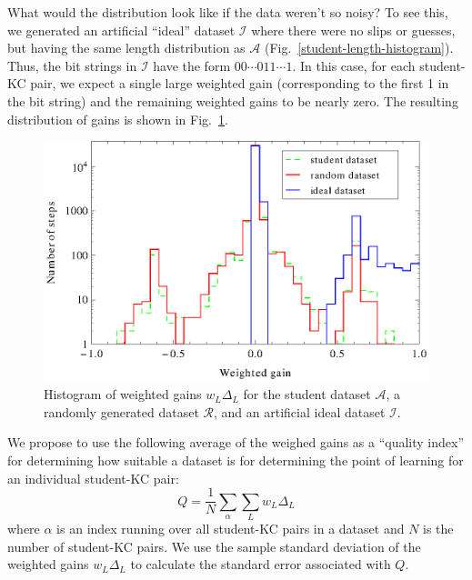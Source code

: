 \documentclass{acmlarge-edm}
\begin{document}
What would the distribution look like if the data weren't 
so noisy?  To see this, we generated an artificial ``ideal'' dataset
$\mathcal{I}$ where there were no slips or guesses, but having
the same length distribution as $\mathcal{A}$ 
(Fig.~\ref{student-length-histogram}).  Thus, the bit strings
in $\mathcal{I}$ have the form $00\cdots011\cdots1$.
In this case, for each student-KC pair, we expect a single 
large weighted gain (corresponding to the first 1 in the bit string) 
and the remaining weighted gains to be nearly zero.  The resulting 
distribution of gains is shown
in  Fig.~\ref{weighted-gain-histogram2}.

\begin{figure}
  \centering \includegraphics{weighted-gain-histogram2.eps}
   \caption{Histogram of weighted gains $w_L \Delta_L$ for
     the student dataset $\mathcal{A}$, 
     a randomly generated dataset $\mathcal{R}$,
     and an artificial ideal dataset $\mathcal{I}$.}
    \label{weighted-gain-histogram2}
\end{figure}


We propose to use the following average of the weighed gains as
a ``quality index'' for determining how suitable a 
dataset is for determining the point of learning for an individual
student-KC pair:
%
\begin{equation}
           Q= \frac{1}{N} \sum_\alpha \sum_L w_L \Delta_L
\end{equation}
%
where $\alpha$ is an index running over all student-KC pairs in a 
dataset and $N$ is the number of student-KC pairs.
We use the sample standard deviation of the weighted gains $w_L \Delta_L$
to calculate the standard error associated with $Q$. 
\end{document}
